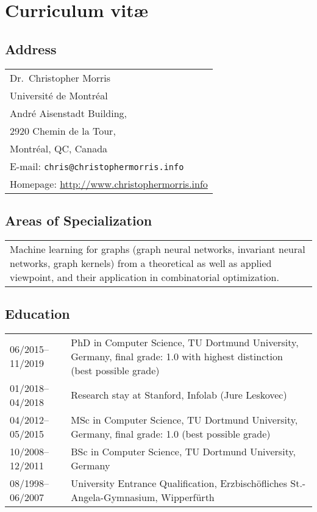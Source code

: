 \documentclass[11pt, a4paper, DIV=12]{scrartcl}
\begin{document}
\section*{\textcolor{upmaroon}{Curriculum vitæ}}
\vspace{-20pt}
\hrulefill
\subsection*{Address}
\noindent
\begin{tabular}{l}
Dr.~Christopher Morris\\
Université de Montréal\\ 
André Aisenstadt Building,\\ 
2920 Chemin de la Tour,\\
Montréal, QC, Canada\\
E-mail: \texttt{chris@christophermorris.info}\\
Homepage: \url{http://www.christophermorris.info}\\
\end{tabular}

\subsection*{Areas of Specialization}
\noindent
\begin{tabular}{p{15.0cm}}
Machine learning for graphs (graph neural networks, invariant neural networks, graph kernels) from a theoretical as well as applied viewpoint, and their application in combinatorial optimization. 
\end{tabular}

\subsection*{Education}
\noindent
\begin{tabular}{p{3.0cm}p{11.5cm}}
	06/2015--11/2019&PhD in Computer Science, TU Dortmund University, Germany, final grade: 1.0 with highest distinction  (best possible grade)\\
	01/2018--04/2018& Research stay at Stanford, Infolab (Jure Leskovec)\\
	04/2012--05/2015&MSc in Computer Science, TU Dortmund University, Germany, final grade: 1.0 (best possible grade)\\
	10/2008--12/2011&BSc in Computer Science, TU Dortmund University, Germany\\
	08/1998--06/2007&University Entrance Qualification, Erzbisch\"ofliches St.-Angela-Gymnasium, Wipperf\"urth\\
\end{tabular}
\end{document}
